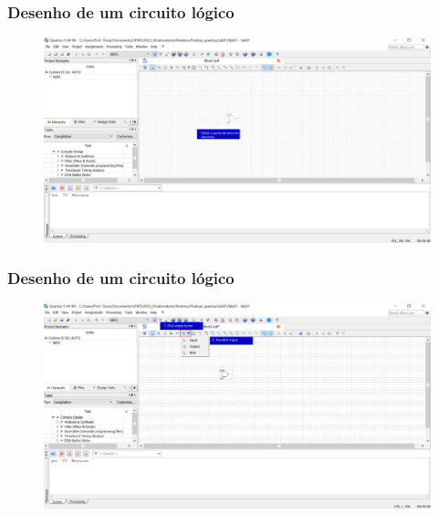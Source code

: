 \documentclass{CPSPresentation}
\begin{document}
\begin{frame}
	\frametitle{Desenho de um circuito lógico}
	
	
	\begin{figure}[h]
		\centering
		\includegraphics[width=1.02\textwidth]{quartus/fig08.pdf}
	\end{figure}
	
	
\end{frame}
\begin{frame}
	\frametitle{Desenho de um circuito lógico}
	
	
	\begin{figure}[h]
		\centering
		\includegraphics[width=1.02\textwidth]{quartus/fig09.pdf}
	\end{figure}
	
	
\end{frame}
\end{document}
